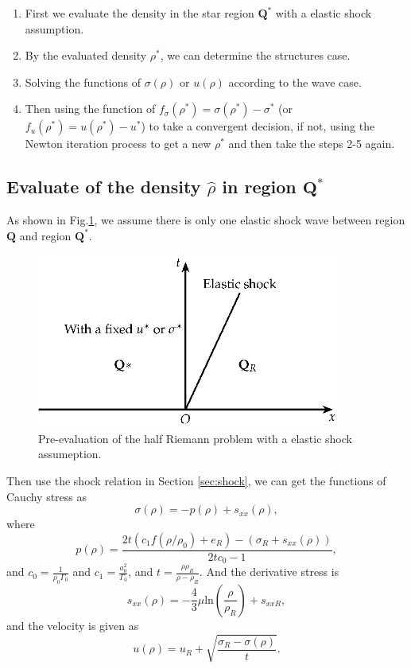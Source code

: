\documentclass[review]{elsarticle}
\begin{document}
\begin{enumerate}[Step 1]
\begin{enumerate}
\item First we  evaluate the density in the star region $\mathbf{Q}^*$ with a  elastic shock assumption. 
\item By the evaluated density $\rho^*$, we can determine the structures case.
\item Solving the functions of $\sigma(\rho)$ or $u(\rho)$ according to the wave case.
  \item 
	Then using the function of $f_\sigma(\rho^*) = \sigma(\rho^*) - \sigma^*$ (or  $f_u(\rho^*)=u(\rho^*) - u^*$) to take a  convergent decision, if not,  using   the  Newton iteration process to get a new $\rho^*$ and then take the steps 2-5 again. 
  \end{enumerate}
\subsection{Evaluate of the density $\hat{\rho}$ in region $\mathbf{Q}^*$ }
As shown in Fig.\ref{fig:half:shock}, we  assume there is only one elastic shock wave between region $\mathbf{Q}$ and region $\mathbf{Q}^*$.

\begin{figure}
  \centering
  \includegraphics[width= 10cm] {Tikz-figure9.eps}
  \caption{Pre-evaluation of the half Riemann problem  with a elastic shock assumeption.}
  \label{fig:half:shock}
\end{figure}
Then use the shock relation in Section \ref{sec:shock}, we can get the functions of Cauchy stress as 
\begin{equation}
  \sigma(\rho) = -p(\rho) +s_{xx}(\rho),
\end{equation}
where 
\begin{equation}
  p(\rho)= \frac{2t(c_1f(\rho/\rho_0)+e_R)-(\sigma_R+s_{xx}(\rho))}{2tc_0-1},
\end{equation}
and $c_0 = \frac{1}{\rho_0\Gamma_0}$ and $c_1 = \frac{a_0^2}{\Gamma_0}$, and  $ t=\frac{\rho\rho_R}{\rho-\rho_R}$. And the derivative stress is 
\begin{equation}
  s_{xx}(\rho) = 
	   -\frac{4}{3}\mu\text{ln}\left(\frac{\rho}{\rho_{R}}\right)+s_{xxR},
 \end{equation}
 and the velocity is given as
 \begin{equation}
   u(\rho) = u_R+ \sqrt{\frac{\sigma_R- \sigma(\rho)}{t}}.
 \end{equation}





\end{enumerate}
\end{document}
